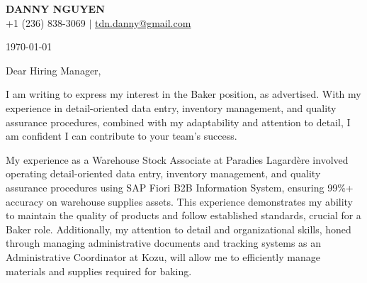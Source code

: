 \documentclass[letterpaper,11pt]{article}
\begin{document}
\begin{center}
\textbf{\Huge \scshape DANNY NGUYEN} \\ \vspace{1pt}
\small +1 (236) 838-3069 $|$ \href{mailto:tdn.danny@gmail.com}{\underline{tdn.danny@gmail.com}}
\end{center}

\today


Dear Hiring Manager,

I am writing to express my interest in the Baker position, as advertised. With my experience in detail-oriented data entry, inventory management, and quality assurance procedures, combined with my adaptability and attention to detail, I am confident I can contribute to your team's success.

My experience as a Warehouse Stock Associate at Paradies Lagardère involved operating detail-oriented data entry, inventory management, and quality assurance procedures using SAP Fiori B2B Information System, ensuring 99\%+ accuracy on warehouse supplies assets. This experience demonstrates my ability to maintain the quality of products and follow established standards, crucial for a Baker role. Additionally, my attention to detail and organizational skills, honed through managing administrative documents and tracking systems as an Administrative Coordinator at Kozu, will allow me to efficiently manage materials and supplies required for baking.
\end{document}
